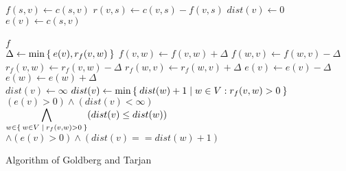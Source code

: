 \documentclass{article}
\begin{document}
\begin{preview}
\begin{algorithm}[H]
\begin{algorithmic}
                    \State $f(s,v) \gets c(s,v)$    
                    \State $r(v,s) \gets c(v,s) - f(v,s)$
                    \State $dist(v) \gets 0$
                    \State $e(v) \gets c(s,v)$ 
                \EndFor
                \\
                        \State {}
                    \EndIf
                        \State {}
                    \EndIf
                \EndWhile
                \\
                \State \Return $f$ 
             \EndFunction
            \\
                \State $\Delta \gets \min\Set{e(v), r_f(v,w)}$
                \State $f(v,w) \gets f(v,w) + \Delta$
                \State $f(w,v) \gets f(w,v) - \Delta$
                \State $r_f(v,w) \gets r_f(v,w) - \Delta$
                \State $r_f(w,v) \gets r_f(w,v) + \Delta$
                \State $e(v) \gets e(v) - \Delta$
                \State $e(w) \gets e(w) + \Delta$
            \EndFunction
            \\
                    \State $dist(v) \gets \infty$
                \Else
                    \State $dist(v) \gets \min\Set{dist(w)+1|w \in V: r_f(v,w) > 0}$
                \EndIf
            \EndFunction
            \\
                \State\Return $(e(v) > 0) \land (dist(v) < \infty)$
            \EndFunction
            \\
                \State\Return {} $\displaystyle \bigwedge_{w \in \Set{w \in V | r_f(v,w) >0}}(dist(v) \leq dist(w))$
            \EndFunction
            \\
                \State\Return {} $\land (e(v) > 0) \land (dist(v) == dist(w)+1)$
            \EndFunction
        \end{algorithmic}
    \caption{Algorithm of Goldberg and Tarjan}
    \label{alg:seq1}
    \end{algorithm}
\end{preview}
\end{document}
